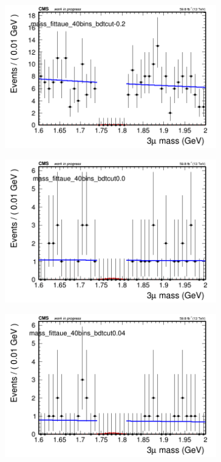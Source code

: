 \begin{figure}[H]
\begin{subfigure}{0.2\textwidth}
        \caption{}
    \end{subfigure}
    \begin{subfigure}{0.2\textwidth}
        \includegraphics[width=\textwidth]{power_law/plots/taue/massfit_taue_40bins_bdtcut-0.2.png}
        \caption{}
    \end{subfigure}
    \begin{subfigure}{0.2\textwidth}
        \includegraphics[width=\textwidth]{power_law/plots/taue/massfit_taue_40bins_bdtcut0.0.png}
        \caption{}
    \end{subfigure}
    \begin{subfigure}{0.2\textwidth}
        \includegraphics[width=\textwidth]{power_law/plots/taue/massfit_taue_40bins_bdtcut0.04.png}

\end{subfigure}
\end{figure}
